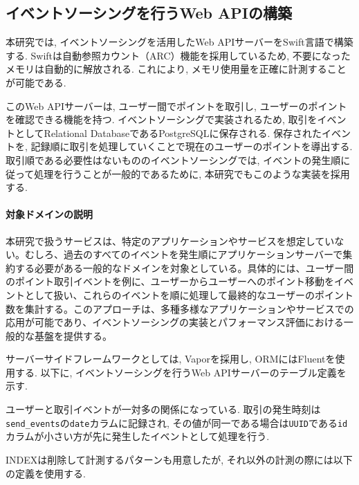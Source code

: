 \documentclass[../../../main]{subfiles}
\begin{document}
    \subsection{イベントソーシングを行うWeb APIの構築}\label{subsec:method-event_sourcing_api}

    本研究では, イベントソーシングを活用したWeb APIサーバーをSwift言語で構築する. Swiftは自動参照カウント（ARC）機能を採用しているため, 不要になったメモリは自動的に解放される. これにより, メモリ使用量を正確に計測することが可能である.

    このWeb APIサーバーは, ユーザー間でポイントを取引し, ユーザーのポイントを確認できる機能を持つ. イベントソーシングで実装されるため, 取引をイベントとしてRelational DatabaseであるPostgreSQLに保存される. 保存されたイベントを, 記録順に取引を処理していくことで現在のユーザーのポイントを導出する. 取引順である必要性はないもののイベントソーシングでは, イベントの発生順に従って処理を行うことが一般的であるために, 本研究でもこのような実装を採用する.

    \paragraph{対象ドメインの説明}
    本研究で扱うサービスは、特定のアプリケーションやサービスを想定していない。むしろ、過去のすべてのイベントを発生順にアプリケーションサーバーで集約する必要がある一般的なドメインを対象としている。具体的には、ユーザー間のポイント取引イベントを例に、ユーザーからユーザーへのポイント移動をイベントとして扱い、これらのイベントを順に処理して最終的なユーザーのポイント数を集計する。このアプローチは、多種多様なアプリケーションやサービスでの応用が可能であり、イベントソーシングの実装とパフォーマンス評価における一般的な基盤を提供する。

    サーバーサイドフレームワークとしては, Vaporを採用し, ORMにはFluentを使用する. 以下に, イベントソーシングを行うWeb APIサーバーのテーブル定義を示す.

    

    ユーザーと取引イベントが一対多の関係になっている. 取引の発生時刻は\texttt{send\_events}の\texttt{date}カラムに記録され, その値が同一である場合は\texttt{UUID}である\texttt{id}カラムが小さい方が先に発生したイベントとして処理を行う.

    INDEXは削除して計測するパターンも用意したが, それ以外の計測の際には以下の定義を使用する.

    
\end{document}
